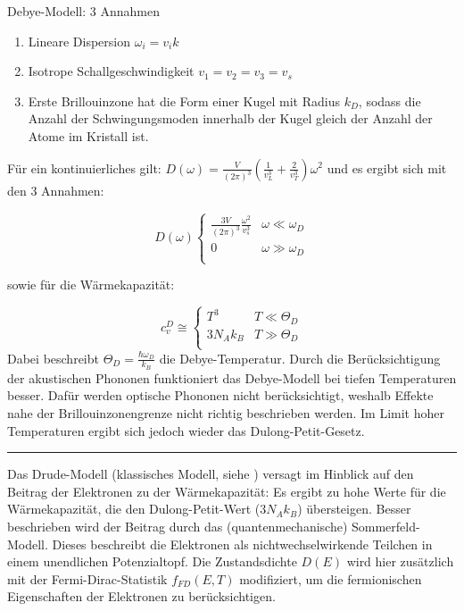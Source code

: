 Debye-Modell: 3 Annahmen

\begin{enumerate}
    \item Lineare Dispersion $\omega_i = v_i k$
    \item Isotrope Schallgeschwindigkeit $v_1 = v_2 = v_3 = v_s$
    \item Erste Brillouinzone hat die Form einer Kugel mit Radius $k_D$, sodass die Anzahl der Schwingungsmoden innerhalb der Kugel gleich der Anzahl der Atome im Kristall ist.     
\end{enumerate}

Für ein kontinuierliches gilt: $D(\omega) = \frac{V}{(2\pi)^3} \left( \frac{1}{v_L^3} + \frac{2}{v_T^3}\right) \omega^2$ und es ergibt sich mit den 3 Annahmen:

\[ D(\omega) \left\{ \begin{array}{ll}
    \frac{3V}{(2\pi)^3} \frac{\omega^2}{v_s^3} & \omega \ll \omega_D \\
    0  & \omega \gg \omega_D \\
    \end{array} \right.
\] 

sowie für die Wärmekapazität:

\[ c_v^D \cong \left\{ \begin{array}{ll}
    T^3 & T \ll \Theta_D \\
    3N_Ak_B  & T \gg \Theta_D \\
    \end{array} \right.
\] 
Dabei beschreibt $\Theta_D = \frac{\hbar \omega_D}{k_B}$ die Debye-Temperatur.
Durch die Berücksichtigung der akustischen Phononen funktioniert das Debye-Modell bei tiefen Temperaturen besser. Dafür werden optische Phononen nicht berücksichtigt, weshalb Effekte nahe der Brillouinzonengrenze nicht richtig beschrieben werden. Im Limit hoher Temperaturen ergibt sich jedoch wieder das Dulong-Petit-Gesetz.

\vspace{.2cm}
\hrule
\vspace{.2cm}
 
\label{q:58}

Das Drude-Modell (klassisches Modell, siehe ) versagt im Hinblick auf den Beitrag der Elektronen zu der Wärmekapazität: Es ergibt zu hohe Werte für die Wärmekapazität, die den Dulong-Petit-Wert ($3N_Ak_B$) übersteigen. Besser beschrieben wird der Beitrag durch das (quantenmechanische) Sommerfeld-Modell. Dieses beschreibt die Elektronen als nichtwechselwirkende Teilchen in einem unendlichen Potenzialtopf. Die Zustandsdichte $D(E)$ wird hier zusätzlich mit der Fermi-Dirac-Statistik $f_{FD} (E, T)$ modifiziert, um die fermionischen Eigenschaften der Elektronen zu berücksichtigen.


